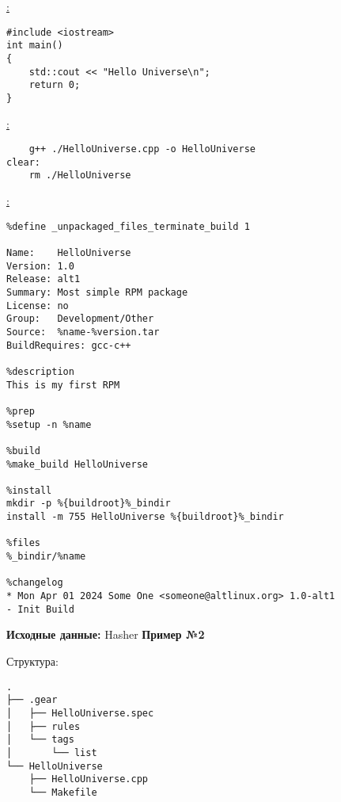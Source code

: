 \noindent\underline{:}
\begin{verbatim}
#include <iostream>
int main()
{
    std::cout << "Hello Universe\n";
    return 0;
}

\end{verbatim}

\noindent\underline{:}
\begin{verbatim}
    g++ ./HelloUniverse.cpp -o HelloUniverse
clear:
    rm ./HelloUniverse

\end{verbatim}

\noindent\underline{:}
\begin{verbatim}
%define _unpackaged_files_terminate_build 1

Name:    HelloUniverse
Version: 1.0
Release: alt1
Summary: Most simple RPM package
License: no
Group:   Development/Other
Source:  %name-%version.tar
BuildRequires: gcc-c++

%description
This is my first RPM

%prep
%setup -n %name

%build
%make_build HelloUniverse

%install
mkdir -p %{buildroot}%_bindir
install -m 755 HelloUniverse %{buildroot}%_bindir

%files
%_bindir/%name

%changelog
* Mon Apr 01 2024 Some One <someone@altlinux.org> 1.0-alt1
- Init Build

\end{verbatim}

\textbf{Исходные данные:} Hasher \textbf{Пример №2}

\noindent Структура:
\begin{verbatim}
.
├── .gear
│   ├── HelloUniverse.spec
│   ├── rules
│   └── tags
│       └── list
└── HelloUniverse
    ├── HelloUniverse.cpp
    └── Makefile

\end{verbatim}

